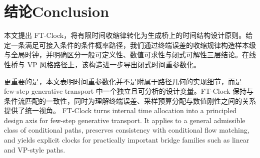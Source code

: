 \section{\ifinternalcn 结论\else Conclusion\fi}

\ifinternalcn
本文提出 FT-Clock，将有限时间收缩律转化为生成桥上的时间结构设计原则。给定一条满足可接入条件的条件概率路径，我们通过终端误差的收缩规律构造样本级与全局时钟，并明确区分一般可定义性、数值可求性与闭式可解性三层结论。在线性桥与 VP 风格路径上，该构造进一步导出闭式时间重参数化。

更重要的是，本文表明时间重参数化并不是附属于路径几何的实现细节，而是 few-step generative transport 中一个独立且可分析的设计变量。FT-Clock 保持与条件流匹配的一致性，同时为理解终端误差、采样预算分配与数值刚性之间的关系提供了统一视角。
\else
FT-Clock turns internal time allocation into a principled design axis for few-step generative transport. It applies to a general admissible class of conditional paths, preserves consistency with conditional flow matching, and yields explicit clocks for practically important bridge families such as linear and VP-style paths.
\fi
